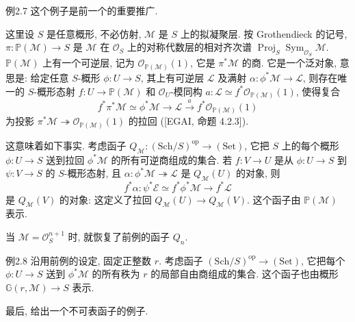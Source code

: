 \begin{origstatement}{例}{2.7}\label{ch02:ex27}
这个例子是前一个的重要推广.

这里设 $S$ 是任意概形, 不必仿射, $\mathcal M$ 是 $S$ 上的拟凝聚层. 按 Grothendieck 的记号, $\pi:\mathbb P(\mathcal M)\to S$ 是 $\mathcal M$ 在 $\mathcal O_S$ 上的对称代数层的相对齐次谱 $\operatorname{Proj}_S\operatorname{Sym}_{\mathcal O_S}\mathcal M$. $\mathbb P(\mathcal M)$ 上有一个可逆层, 记为 $\mathcal O_{\mathbb P(\mathcal M)}(1)$, 它是 $\pi^*\mathcal M$ 的商. 它是一个泛对象, 意思是: 给定任意 $S$-概形 $\phi:U\to S$, 其上有可逆层 $\mathcal L$ 及满射 $\alpha:\phi^*\mathcal M\to\mathcal L$, 则存在唯一的 $S$-概形态射 $f:U\to\mathbb P(\mathcal M)$ 和 $\mathcal O_U$-模同构 $a:\mathcal L\simeq f^*\mathcal O_{\mathbb P(\mathcal M)}(1)$, 使得复合
\[
f^*\pi^*\mathcal M\simeq\phi^*\mathcal M\longrightarrow\mathcal L\xrightarrow{a}f^*\mathcal O_{\mathbb P(\mathcal M)}(1)
\]
为投影 $\pi^*\mathcal M\twoheadrightarrow\mathcal O_{\mathbb P(\mathcal M)}(1)$ 的拉回 ([EGAI, 命题 4.2.3]).

这意味着如下事实. 考虑函子 $Q_{\mathcal M}:(\mathrm{Sch}/S)^{\mathrm{op}}\to(\mathrm{Set})$, 它把 $S$ 上的每个概形 $\phi:U\to S$ 送到拉回 $\phi^*\mathcal M$ 的所有可逆商组成的集合. 若 $f:V\to U$ 是从 $\phi:U\to S$ 到 $\psi:V\to S$ 的 $S$-概形态射, 且 $\alpha:\phi^*\mathcal M\twoheadrightarrow\mathcal L$ 是 $Q_{\mathcal M}(U)$ 的对象, 则
\[
f^*\alpha:\psi^*\mathcal E\simeq f^*\phi^*\mathcal M\longrightarrow f^*\mathcal L
\]
是 $Q_{\mathcal M}(V)$ 的对象: 这定义了拉回 $Q_{\mathcal M}(U)\to Q_{\mathcal M}(V)$. 这个函子由 $\mathbb P(\mathcal M)$ 表示.

当 $\mathcal M=\mathcal O_S^{n+1}$ 时, 就恢复了前例的函子 $Q_n$.
\end{origstatement}

\begin{origstatement}{例}{2.8}\label{ch02:ex28}
沿用前例的设定, 固定正整数 $r$. 考虑函子 $(\mathrm{Sch}/S)^{\mathrm{op}}\to(\mathrm{Set})$, 它把每个 $\phi:U\to S$ 送到
$\phi^*\mathcal M$ 的所有秩为 $r$ 的局部自由商组成的集合. 这个函子也由概形 $\mathbb G(r,\mathcal M)\to S$ 表示.
\end{origstatement}

最后, 给出一个不可表函子的例子.

